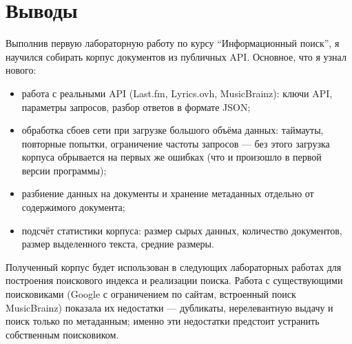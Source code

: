 \section{Выводы}
Выполнив первую лабораторную работу по курсу \enquote{Информационный поиск}, я
научился собирать корпус документов из публичных API. Основное, что я узнал
нового:

\begin{itemize}
    \item работа с реальными API (Last.fm, Lyrics.ovh, MusicBrainz): ключи API,
    параметры запросов, разбор ответов в формате JSON;
    \item обработка сбоев сети при загрузке большого объёма данных: таймауты,
    повторные попытки, ограничение частоты запросов --- без этого загрузка
    корпуса обрывается на первых же ошибках (что и произошло в первой версии
    программы);
    \item разбиение данных на документы и хранение метаданных отдельно от
    содержимого документа;
    \item подсчёт статистики корпуса: размер сырых данных, количество
    документов, размер выделенного текста, средние размеры.
\end{itemize}

Полученный корпус будет использован в следующих лабораторных работах для
построения поискового индекса и реализации поиска. Работа с существующими
поисковиками (Google с ограничением по сайтам, встроенный поиск MusicBrainz)
показала их недостатки --- дубликаты, нерелевантную выдачу и поиск только по
метаданным; именно эти недостатки предстоит устранить собственным поисковиком.

\pagebreak
